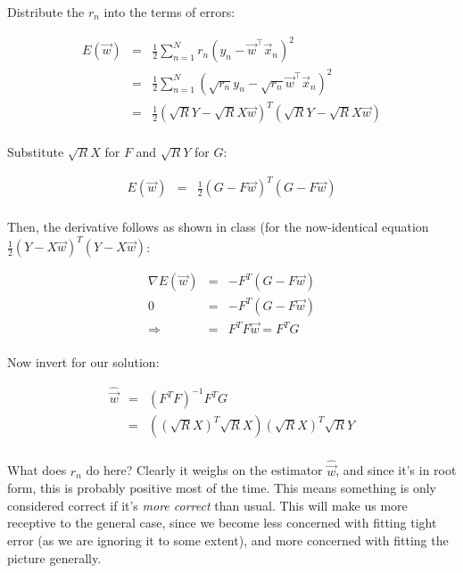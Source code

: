 \documentclass[fleqn]{article}
\begin{document}
\begin{solution}

Distribute the $r_n$ into the terms of errors:

\begin{eqnarray*}
 E(\vec{w}) & = & \frac{1}{2}\sum_{n=1}^N r_n(y_n - \vec{w}^\top\vec{x}_n)^2 \\
 & = & \frac{1}{2}\sum_{n=1}^N (\sqrt{r_n} y_n - \sqrt{r_n} \vec{w}^\top\vec{x}_n)^2 \\
& = & \frac{1}{2} (\sqrt{R} Y - \sqrt{R} X\vec{w})^T (\sqrt{R} Y - \sqrt{R} X\vec{w}) \\
\end{eqnarray*}

Substitute $\sqrt{R}X$ for $F$ and $\sqrt{R}Y$ for $G$:

\begin{eqnarray*}
 E(\vec{w}) & = & \frac{1}{2} (G - F\vec{w})^T (G - F\vec{w}) \\
\end{eqnarray*}

Then, the derivative follows as shown in class (for the now-identical equation $\frac{1}{2} (Y-X\vec{w})^T (Y-X\vec{w})$:

\begin{eqnarray*}
\nabla E(\vec{w}) & = & - F^T (G - F \vec{w}) \\
0 & = & - F^T (G - F \vec{w}) \\
\Rightarrow & = & F^T F \vec{w} = F^T G \\
\end{eqnarray*}

Now invert for our solution:

\begin{eqnarray*}
\hat{\vec{w}} & = & (F^T F)^{-1} F^T G \\
& = & ((\sqrt{R}X)^T \sqrt{R}X) (\sqrt{R}X)^T \sqrt{R}Y \\
\end{eqnarray*}

What does $r_n$ do here? Clearly it weighs on the estimator $\hat{\vec{w}}$, and since it's in root form, this is probably positive most of the time. This means something is only considered correct if it's \textit{more correct} than usual. This will make us more receptive to the general case, since we become less concerned with fitting tight error (as we are ignoring it to some extent), and more concerned with fitting the picture generally.

\end{solution}
\end{document}

